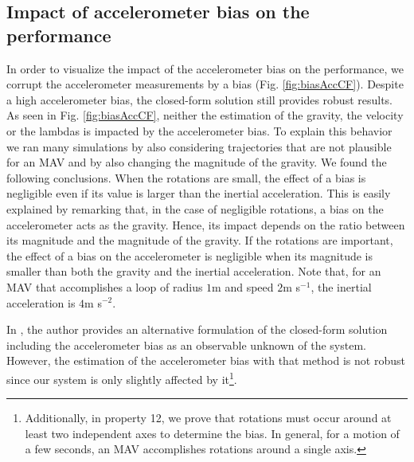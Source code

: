 \documentclass[letterpaper, 10 pt, journal, twoside]{IEEEtran}  %
\begin{document}
\subsection{Impact of accelerometer bias on the performance \label{sec:biasAcc}}
In order to visualize the impact of the accelerometer bias on the performance,
we corrupt the accelerometer measurements by a bias (Fig. \ref{fig:biasAccCF}).
Despite a high accelerometer bias, the closed-form solution still provides robust results.
As seen in Fig. \ref{fig:biasAccCF}, neither the estimation of the gravity, the velocity or the lambdas is impacted by the accelerometer bias.
To explain this behavior we ran many simulations by also considering trajectories that are not plausible for an MAV and by also changing the magnitude of the gravity. We found the following conclusions. When the rotations are small, the effect of a bias is negligible even if its value is larger than the inertial acceleration. This is easily explained by remarking that, in the case of negligible rotations, a bias on the accelerometer acts as the gravity. Hence, its impact depends on the ratio between its magnitude and the magnitude of the gravity.
If the rotations are important, the effect of a bias on the accelerometer is negligible when its magnitude is smaller than both the gravity and the inertial acceleration. Note that, for an MAV that accomplishes a loop of radius $1$m and speed $2$m s$^{-1}$, the inertial acceleration is $4$m s$^{-2}$.

In \cite{Martinelli2014}, the author provides an alternative formulation of the closed-form solution including the accelerometer bias as an observable unknown of the system.
However, the estimation of the accelerometer bias with that method is not robust since our system is only slightly affected by it\footnote{Additionally, in \cite{Martinelli2014} property 12, we prove that rotations must occur around at least two independent axes to determine the bias. In general, for a motion of a few seconds, an MAV accomplishes rotations around a single axis.}.
\end{document}
